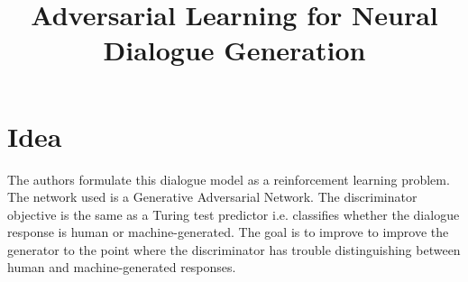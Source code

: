 \documentclass[12pt]{article}
\begin{document}
\title{Adversarial Learning for Neural Dialogue Generation}
\author{}
\date{}
\maketitle

\section{Idea}
  The authors formulate this dialogue model as a reinforcement learning problem. The network used is a Generative Adversarial Network. The discriminator objective is the same as a Turing test predictor i.e. classifies whether the dialogue response is human or machine-generated. The goal is to improve to improve the generator to the point where the discriminator has trouble distinguishing between human and machine-generated responses.
\end{document}
